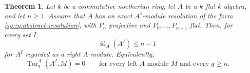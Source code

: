\documentclass[11pt]{article}
\numberwithin{equation}{section}
\newtheorem{theorem}{Theorem}[section]
\theoremstyle{definition}
\theoremstyle{remark}
\newcommand{\Tor}{\operatorname{Tor}}
\newcommand{\fd}{\operatorname{fd}}
\begin{document}
\begin{theorem}\label{sy:thm:product-tor-bound}
Let $k$ be a commutative noetherian ring, let $A$ be a $k$-flat
$k$-algebra, and let $n\geq1$.  Assume that $A$ has an exact $A^{\mathrm e}$-module resolution of
the form \eqref{sy:eq:abstract-resolution}, with $P_n$ projective
and $P_0,\ldots,P_{n-1}$ flat.  Then, for every set $I$,
\begin{equation}
\fd_A(A^I)\leq n-1
\label{sy:eq:fd-product}
\end{equation}
for $A^I$ regarded as a right $A$-module.  Equivalently,
\begin{equation}
\Tor_q^A(A^I,M)=0
\qquad
\text{for every left $A$-module $M$ and every }q\geq n.
\label{sy:eq:tor-product-vanishing}
\end{equation}
\end{theorem}
\end{document}
